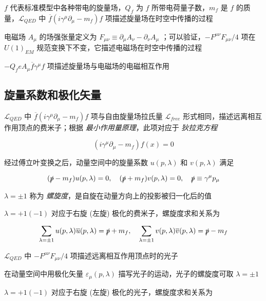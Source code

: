 $f$ 代表标准模型中各种带电的旋量场，$Q_f$ 为 $f$ 所带电荷量子数，$m_f$ 是 $f$ 的质量，$\mathcal{L}_{QED}$ 中 $\overline{f} (i \gamma^\mu \partial_\mu - m_f) f$ 项描述旋量场在时空中传播的过程

电磁场 $A_\mu$ 的场强张量定义为 $F_{\mu\nu} \equiv \partial_\mu A_\nu - \partial_\nu A_\mu$ ；可以验证，$-F^{\mu\nu} F_{\mu\nu}/4$ 项在$U(1)_{EM}$ 规范变换下不变，它描述电磁场在时空中传播的过程

$- Q_f e A_\mu \overline{f}\gamma^\mu f$ 项描述旋量场与电磁场的电磁相互作用

\subsection{旋量系数和极化矢量}

$\mathcal{L}_{QED}$ 中 $\overline{f} (i \gamma^\mu \partial_\mu - m_f)f$ 项与自由旋量场拉氏量 $\mathcal{L}_{free}$ 形式相同，描述远离相互作用顶点的费米子；根据 \emph{最小作用量原理}，此项对应于 \emph{狄拉克方程}

\begin{equation}
    (i\gamma^\mu \partial_\mu - m_f) f(x) = 0
\end{equation}

经过傅立叶变换之后，动量空间中的旋量系数 $u(p, \lambda)$ 和 $v(p, \lambda)$ 满足

\begin{equation}
    (\slashed{p} - m_f) u(p, \lambda) = 0, \quad (\slashed{p} + m_f) v(p, \lambda) = 0, \quad \slashed{p} \equiv \gamma^\mu p_\mu
\end{equation}

$\lambda = \pm 1$ 称为 \emph{螺旋度}，是自旋在动量方向上的投影被归一化后的值

$\lambda = +1 (-1)$ 对应于右旋 (左旋) 极化的费米子，螺旋度求和关系为

\begin{equation}
    \sum_{\lambda=\pm 1} u(p, \lambda) \overline{u}(p, \lambda) = \slashed{p} + m_f, \quad \sum_{\lambda=\pm 1} v(p, \lambda) \overline{v}(p, \lambda) = \slashed{p} - m_f
\end{equation}

$\mathcal{L}_{QED}$ 中 $-F^{\mu\nu} F_{\mu\nu}/4$ 项描述远离相互作用顶点时的光子

在动量空间中用极化矢量 $\varepsilon_\mu(p, \lambda)$ 描写光子的运动，光子的螺旋度可取 $\lambda = \pm 1$

$\lambda = +1 (-1)$ 对应于右旋 (左旋) 极化的光子，螺旋度求和关系为

